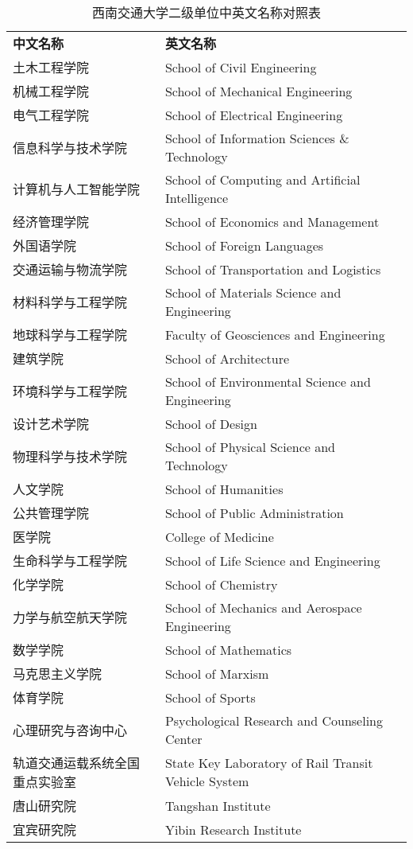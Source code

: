 \begin{table}[!ht]
\centering
\caption{西南交通大学二级单位中英文名称对照表}
\begin{tabular}{ll}
\label{tabA-1}
\textbf{中文名称} & \textbf{英文名称}  \\
土木工程学院	& School of Civil Engineering \\
机械工程学院	& School of Mechanical Engineering \\
电气工程学院	& School of Electrical Engineering \\
信息科学与技术学院 & School of Information Sciences \& Technology \\
计算机与人工智能学院 & School of Computing and Artificial Intelligence \\
经济管理学院	& School of Economics and Management \\
外国语学院 & School of Foreign Languages \\
交通运输与物流学院 & School of Transportation and Logistics \\
材料科学与工程学院 & School of Materials Science and Engineering \\
地球科学与工程学院 & Faculty of Geosciences and Engineering \\
建筑学院	& School of Architecture \\
环境科学与工程学院 & School of Environmental Science and Engineering \\
设计艺术学院	& School of Design \\
物理科学与技术学院 & School of Physical Science and Technology \\
人文学院	& School of Humanities \\
公共管理学院	& School of Public Administration \\
医学院 & College of Medicine \\
生命科学与工程学院 & School of Life Science and Engineering \\
化学学院	& School of Chemistry \\
力学与航空航天学院 & School of Mechanics and Aerospace Engineering \\
数学学院	& School of Mathematics \\
马克思主义学院 & School of Marxism \\
体育学院	& School of Sports \\
心理研究与咨询中心 & Psychological Research and Counseling Center \\
轨道交通运载系统全国重点实验室	& State Key Laboratory of Rail Transit Vehicle System \\
唐山研究院 & Tangshan Institute \\
宜宾研究院 & Yibin Research Institute \\
\end{tabular}
\end{table}

